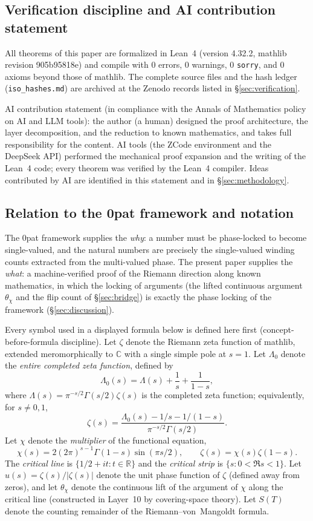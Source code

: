 \documentclass{article}
\newcommand{\C}{\mathbb{C}}
\newcommand{\R}{\mathbb{R}}
\newcommand{\GG}{\Gamma}
\newcommand{\zt}{\zeta}
\newcommand{\Lam}{\Lambda}
\newcommand{\Xchi}{\chi}
\begin{document}
\subsection{Verification discipline and AI contribution statement}
\label{sec:calibration}

All theorems of this paper are formalized in Lean~4 (version 4.32.2, mathlib
revision 905b95818e) and compile with $0$ errors, $0$ warnings, $0$
\texttt{sorry}, and $0$ axioms beyond those of mathlib. The complete source
files and the hash ledger (\texttt{iso\_hashes.md}) are archived at the
Zenodo records listed in \S\ref{sec:verification}.

AI contribution statement (in compliance with the Annals of Mathematics
policy on AI and LLM tools): the author (a human) designed the proof
architecture, the layer decomposition, and the reduction to known
mathematics, and takes full responsibility for the content. AI tools (the
ZCode environment and the DeepSeek API) performed the
mechanical proof expansion and the writing
of the Lean~4 code; every theorem was verified by the Lean~4 compiler. Ideas
contributed by AI are identified in this statement and in
\S\ref{sec:methodology}.

\subsection{Relation to the 0pat framework and notation}
\label{sec:relation}

The 0pat framework supplies the \emph{why}: a number must be phase-locked to
become single-valued, and the natural numbers are precisely the single-valued
winding counts extracted from the multi-valued phase. The present paper
supplies the \emph{what}: a machine-verified proof of the Riemann direction
along known mathematics, in which the locking of arguments (the lifted
continuous argument $\theta_\Xchi$ and the flip count of
\S\ref{sec:bridge}) is exactly the phase locking of the framework
(\S\ref{sec:discussion}).

Every symbol used in a displayed formula below is defined here first
(concept-before-formula discipline). Let $\zt$ denote the Riemann zeta
function of mathlib, extended meromorphically to $\C$ with a single simple
pole at $s=1$. Let $\Lam_0$ denote the \emph{entire completed zeta
function}, defined by
\[
\Lam_0(s)=\Lam(s)+\frac{1}{s}+\frac{1}{1-s},
\]
where $\Lam(s)=\pi^{-s/2}\GG(s/2)\zt(s)$ is the completed zeta function;
equivalently, for $s\neq 0,1$,
\[
\zt(s)=\frac{\Lam_0(s)-1/s-1/(1-s)}{\pi^{-s/2}\GG(s/2)}.
\]
Let $\Xchi$ denote the \emph{multiplier} of the functional equation,
\[
\Xchi(s)=2(2\pi)^{s-1}\GG(1-s)\sin(\pi s/2),
\qquad
\zt(s)=\Xchi(s)\zt(1-s).
\]
The \emph{critical line} is $\{1/2+it:t\in\R\}$ and the \emph{critical
strip} is $\{s:0<\Re s<1\}$. Let $u(s)=\zt(s)/|\zt(s)|$ denote the unit
phase function of $\zt$ (defined away from zeros), and let $\theta_\Xchi$
denote the continuous lift of the argument of $\Xchi$ along the critical
line (constructed in Layer~10 by covering-space theory). Let
$S(T)$ denote the counting remainder of the Riemann--von~Mangoldt formula.
\end{document}
